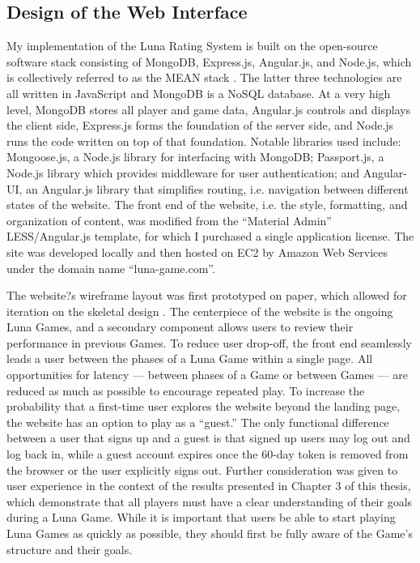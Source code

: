 \subsection{Design of the Web Interface}

My implementation of the Luna Rating System is built on the open-source software stack consisting of MongoDB, Express.js, Angular.js, and Node.js, which is collectively referred to as the MEAN stack \citep{karpov2013mean}. The latter three technologies are all written in JavaScript and MongoDB is a NoSQL database. At a very high level, MongoDB stores all player and game data, Angular.js controls and displays the client side, Express.js forms the foundation of the server side, and Node.js runs the code written on top of that foundation. Notable libraries used include: Mongoose.js, a Node.js library for interfacing with MongoDB; Passport.js, a Node.js library which provides middleware for user authentication; and Angular-UI, an Angular.js library that simplifies routing, i.e. navigation between different states of the website. The front end of the website, i.e. the style, formatting, and organization of content, was modified from the ``Material Admin'' LESS/Angular.js template, for which I purchased a single application license. The site was developed locally and then hosted on EC2 by Amazon Web Services under the domain name ``luna-game.com''.

The website?s wireframe layout was first prototyped on paper, which allowed for iteration on the skeletal design \citep{rettig1994prototyping}. The centerpiece of the website is the ongoing Luna Games, and a secondary component allows users to review their performance in previous Games. To reduce user drop-off, the front end seamlessly leads a user between the phases of a Luna Game within a single page. All opportunities for latency --- between phases of a Game or between Games ---  are reduced as much as possible to encourage repeated play. To increase the probability that a first-time user explores the website beyond the landing page, the website has an option to play as a ``guest.'' The only functional difference between a user that signs up and a guest is that signed up users may log out and log back in, while a guest account expires once the 60-day token is removed from the browser or the user explicitly signs out. Further consideration was given to user experience in the context of the results presented in Chapter 3 of this thesis, which demonstrate that all players must have a clear understanding of their goals during a Luna Game. While it is important that users be able to start playing Luna Games as quickly as possible, they should first be fully aware of the Game's structure and their goals.

